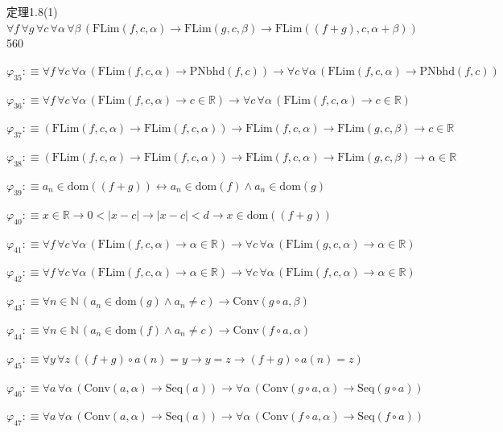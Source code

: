 \begin{fullproof}{定理1.8(1)}{$\forall f\,\forall g\,\forall c\,\forall \alpha\,\forall \beta\,(\mathrm{FLim}(f,c,\alpha) \to \mathrm{FLim}(g,c,\beta) \to \mathrm{FLim}((f + g),c,\alpha + \beta))$}{560}
\begin{abbrevlist}
\item $\varphi_{35} :\equiv \forall f\,\forall c\,\forall \alpha\,(\mathrm{FLim}(f,c,\alpha) \to \mathrm{PNbhd}(f,c)) \to \forall c\,\forall \alpha\,(\mathrm{FLim}(f,c,\alpha) \to \mathrm{PNbhd}(f,c))$
\item $\varphi_{36} :\equiv \forall f\,\forall c\,\forall \alpha\,(\mathrm{FLim}(f,c,\alpha) \to c \in \mathbb{R}) \to \forall c\,\forall \alpha\,(\mathrm{FLim}(f,c,\alpha) \to c \in \mathbb{R})$
\item $\varphi_{37} :\equiv (\mathrm{FLim}(f,c,\alpha) \to \mathrm{FLim}(f,c,\alpha)) \to \mathrm{FLim}(f,c,\alpha) \to \mathrm{FLim}(g,c,\beta) \to c \in \mathbb{R}$
\item $\varphi_{38} :\equiv (\mathrm{FLim}(f,c,\alpha) \to \mathrm{FLim}(f,c,\alpha)) \to \mathrm{FLim}(f,c,\alpha) \to \mathrm{FLim}(g,c,\beta) \to \alpha \in \mathbb{R}$
\item $\varphi_{39} :\equiv a_{n} \in \mathrm{dom}((f + g)) \leftrightarrow a_{n} \in \mathrm{dom}(f) \land a_{n} \in \mathrm{dom}(g)$
\item $\varphi_{40} :\equiv x \in \mathbb{R} \to 0 < \lvert x - c \rvert \to \lvert x - c \rvert < d \to x \in \mathrm{dom}((f + g))$
\item $\varphi_{41} :\equiv \forall f\,\forall c\,\forall \alpha\,(\mathrm{FLim}(f,c,\alpha) \to \alpha \in \mathbb{R}) \to \forall c\,\forall \alpha\,(\mathrm{FLim}(g,c,\alpha) \to \alpha \in \mathbb{R})$
\item $\varphi_{42} :\equiv \forall f\,\forall c\,\forall \alpha\,(\mathrm{FLim}(f,c,\alpha) \to \alpha \in \mathbb{R}) \to \forall c\,\forall \alpha\,(\mathrm{FLim}(f,c,\alpha) \to \alpha \in \mathbb{R})$
\item $\varphi_{43} :\equiv \forall n \in \mathbb{N}\,(a_{n} \in \mathrm{dom}(g) \land a_{n} \neq c) \to \mathrm{Conv}(g \circ a,\beta)$
\item $\varphi_{44} :\equiv \forall n \in \mathbb{N}\,(a_{n} \in \mathrm{dom}(f) \land a_{n} \neq c) \to \mathrm{Conv}(f \circ a,\alpha)$
\item $\varphi_{45} :\equiv \forall y\,\forall z\,((f + g) \circ a(n) = y \to y = z \to (f + g) \circ a(n) = z)$
\item $\varphi_{46} :\equiv \forall a\,\forall \alpha\,(\mathrm{Conv}(a,\alpha) \to \mathrm{Seq}(a)) \to \forall \alpha\,(\mathrm{Conv}(g \circ a,\alpha) \to \mathrm{Seq}(g \circ a))$
\item $\varphi_{47} :\equiv \forall a\,\forall \alpha\,(\mathrm{Conv}(a,\alpha) \to \mathrm{Seq}(a)) \to \forall \alpha\,(\mathrm{Conv}(f \circ a,\alpha) \to \mathrm{Seq}(f \circ a))$

\end{abbrevlist}
\end{fullproof}
